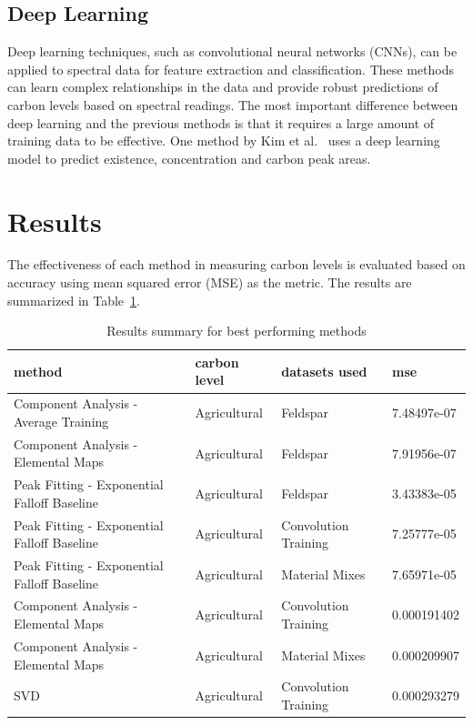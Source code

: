 \documentclass[review]{elsarticle}
\begin{document}
\subsection{Deep Learning}

Deep learning techniques, such as convolutional neural networks (CNNs), can be applied to spectral data for feature extraction and classification. These methods can learn complex relationships in the data and provide robust predictions of carbon levels based on spectral readings. The most important difference between deep learning and the previous methods is that it requires a large amount of training data to be effective. One method by Kim et al.~\cite{kim_deep_2025} uses a deep learning model to predict existence, concentration and carbon peak areas.

\section{Results}

The effectiveness of each method in measuring carbon levels is evaluated based on accuracy using mean squared error (MSE) as the metric. The results are summarized in Table~\ref{tab:results_summary}.

\begin{table}[H]
\centering
\caption{Results summary for best performing methods}
\label{tab:results_summary}
\begin{tabular}{@{}llll@{}}
\toprule
method & carbon level & datasets used & mse \\
\midrule
Component Analysis - Average Training & Agricultural & Feldspar & 7.48497e-07 \\
Component Analysis - Elemental Maps & Agricultural & Feldspar & 7.91956e-07 \\
Peak Fitting - Exponential Falloff Baseline & Agricultural & Feldspar & 3.43383e-05 \\
Peak Fitting - Exponential Falloff Baseline & Agricultural & Convolution Training & 7.25777e-05 \\
Peak Fitting - Exponential Falloff Baseline & Agricultural & Material Mixes & 7.65971e-05 \\
Component Analysis - Elemental Maps & Agricultural & Convolution Training & 0.000191402 \\
Component Analysis - Elemental Maps & Agricultural & Material Mixes & 0.000209907 \\
SVD & Agricultural & Convolution Training & 0.000293279 \\
\bottomrule
\end{tabular}
\end{table}
\end{document}
